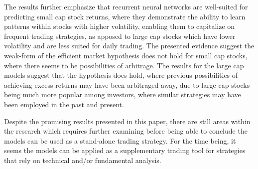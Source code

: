 \indent\newline
The results further emphasize that recurrent neural networks are well-suited for predicting small cap stock returns, where they demonstrate the ability to learn patterns within stocks with higher volatility, enabling them to capitalize on frequent trading strategies, as apposed to large cap stocks which have lower volatility and are less suited for daily trading. The presented evidence suggest the weak-form of the efficient market hypothesis does not hold for small cap stocks, where there seems to be possibilities of arbitrage. The results for the large cap models suggest that the hypothesis does hold, where previous possibilities of achieving excess returns may have been arbitraged away, due to large cap stocks being much more popular among investors, where similar strategies may have been employed in the past and present. 

\indent\newline
Despite the promising results presented in this paper, there are still areas within the research which requires further examining before being able to conclude the models can be used as a stand-alone trading strategy. For the time being, it seems the models can be applied as a supplementary trading tool for strategies that rely on technical and/or fundamental analysis.  